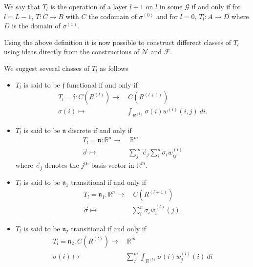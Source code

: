 \begin{definition}
We say that $T_l$ is the operation of a layer $l+1$ on $l$ in some $\mathcal{G}$ if and only if for $l=L-1$, $T:C\to B$ with $C$ the codomain of $\sigma^{(0)}$ and for $l = 0$, $T_l : A\to D$ where $D$ is the domain of $\sigma^{(1)}.$
\end{definition}

Using the above definition it is now possible to construct different classes of $T_l$ using ideas directly from the constructions of $\mathcal{N}$ and $\mathcal{F}$.

\begin{definition}
We suggest several classes of $T_l$ as follows
	\begin{itemize}
	\item $T_l$ is said to be $\mathfrak{f}$ functional if and only if 
		\begin{equation} \label{eq:tlfunctional}
		\begin{aligned} 
			T_l = \mathfrak{f}: C(R^{(l)}) \to&\ C(R^{(l+1)}) \\
			\sigma(i) \mapsto& \int_{R^{(l)}} \sigma(i) w^{(l)}(i,j)\ di.
		\end{aligned}
		\end{equation}
	\item $T_l$ is said to be $\mathfrak{n}$ discrete if and only if 
		\begin{equation} \label{eq:tldiscrete}
		\begin{aligned} 
			T_l = \mathfrak{n}: \mathbb{R}^n \to&\ \mathbb{R}^m \\
			\vec{\sigma} \mapsto& \sum_j^m \vec{e}_j\sum_i^n \sigma_i w^{(l)}_{ij}
		\end{aligned}
		\end{equation}
		where $\vec{e}_j$ denotes the $j^\mathrm{th}$ basis vector in $\mathbb{R}^m$.
	\item $T_l$ is said to be $\mathfrak{n}_1$ transitional if and only if 
		\begin{equation} \label{eq:tldiscrete}
		\begin{aligned} 
			T_l = \mathfrak{n}_1: \mathbb{R}^n \to&\  C(R^{(l+1)}) \\
			\vec{\sigma} \mapsto& \sum_i^n \sigma_i w^{(l)}_i(j).
		\end{aligned}
		\end{equation}
	\item $T_l$ is said to be $\mathfrak{n}_2$ transitional if and only if 
		\begin{equation} \label{eq:tldiscrete}
		\begin{aligned} 
			T_l = \mathfrak{n}_2: C(R^{(l)}) \to&\ \mathbb{R}^m \\
			\sigma(i) \mapsto& \sum_j^m \int_{R^{(l)}} \sigma(i) w^{(l)}_j(i)\ di
		\end{aligned}
		\end{equation}
	\end{itemize}
\end{definition}

